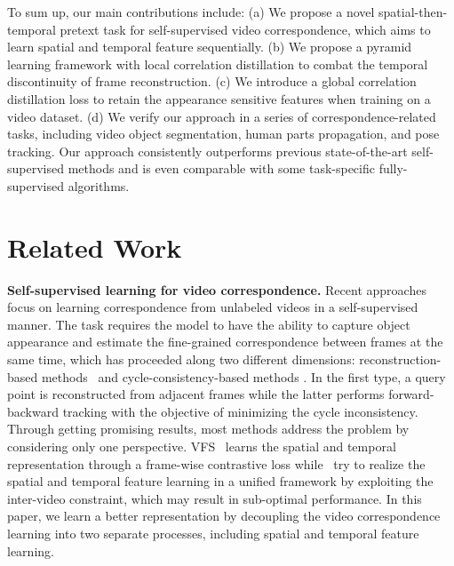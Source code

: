 \documentclass{article}
\begin{document}
To sum up, our main contributions include: (a) We propose a novel spatial-then-temporal pretext task for self-supervised video correspondence, which aims to learn spatial and temporal feature sequentially. (b) We propose a pyramid learning framework with local correlation distillation to combat the temporal discontinuity of frame reconstruction. (c) We introduce a global correlation distillation loss to retain the appearance sensitive features when training on a video dataset. (d) We verify our approach in a series of correspondence-related tasks, including video object segmentation, human parts propagation, and pose tracking. Our approach consistently outperforms previous state-of-the-art self-supervised methods and is even comparable with some task-specific fully-supervised algorithms.

\section{Related Work}
\textbf{Self-supervised learning for video correspondence.} 
Recent approaches focus on learning correspondence from unlabeled videos in a self-supervised manner. The task requires the model to have the ability to capture object appearance and estimate the fine-grained correspondence between frames at the same time, which has proceeded along two different dimensions: reconstruction-based methods~\cite{lai2019self}\cite{lai2020mast}\cite{li2019joint}\cite{vondrick2018tracking}\cite{wang2020contrastive} and cycle-consistency-based methods \cite{jabri2020space}\cite{wang2019learning}\cite{zhao2021modelling}. In the first type, a query point is reconstructed from adjacent frames while the latter performs forward-backward tracking with the objective of minimizing the cycle inconsistency. Through getting promising results, most methods address the problem by considering only one perspective. VFS~\cite{xu2021rethinking} learns the spatial and temporal representation through a frame-wise contrastive loss while~\cite{araslanov2021dense}\cite{wang2020contrastive} try to realize the spatial and temporal feature learning in a unified framework by exploiting the inter-video constraint, which may result in sub-optimal performance. In this paper, we learn a better representation by decoupling the video correspondence learning into two separate processes, including spatial and temporal feature learning.
\end{document}
